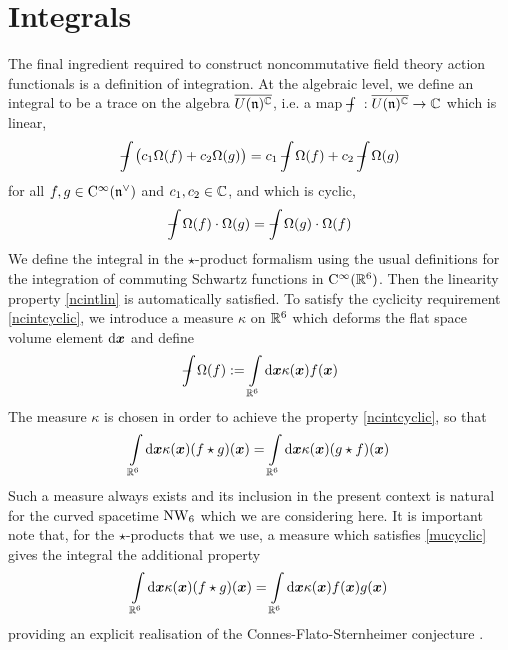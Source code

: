 \section{Integrals}
\label{Integrals}
The final ingredient required to construct noncommutative field theory action
functionals is a definition of integration. At the algebraic level, we define an
integral to be a trace on the algebra $\overline{U({\mathfrak n})^{\mathbb C}}$, i.e. a map
$\int\!\!\!\!\!\! - ~:\overline{U({\mathfrak n})^{\mathbb C}}\to{\mathbb C}$ which is linear,
\begin{equation}
  \label{ncintlin}
  \ncint\bigl(c_1 \Omega(f)+c_2 \Omega(g)\bigr)=
  c_1 \ncint\Omega(f)+c_2 \ncint\Omega(g)
\end{equation}
for all $f,g\in{\rm C}^\infty({\mathfrak n}^\vee)$ and $c_1,c_2\in{\mathbb C}$, and which is cyclic,
\begin{equation}
  \label{ncintcyclic}
  \ncint\Omega(f)\cdot\Omega(g)=\ncint\Omega(g)\cdot\Omega(f)
\end{equation}
We define the integral in the $\star$-product formalism using the usual
definitions for the integration of commuting Schwartz functions in
${\rm C}^\infty({\mathbb R}^6)$. Then the linearity property \eqref{ncintlin} is
automatically satisfied. To satisfy the cyclicity requirement
\eqref{ncintcyclic}, we introduce
\cite{CalWohl1,BehrSyk1,Agostini:2004cu,Dimitrijevic:2003wv,FelShoi1} a measure
$\kappa$ on ${\mathbb R}^6$ which deforms the flat space volume element ${\rm d}{\boldsymbol {x} }$ and
define
\begin{equation}
  \label{ncintdef}
  \ncint\Omega(f):=\int\limits_{\R^6} \dd\mbf x \kappa(\mbf x) f(\mbf x)
\end{equation}
The measure $\kappa$ is chosen in order to achieve the property
\eqref{ncintcyclic}, so that
\begin{equation}
  \label{mucyclic}
  \int\limits_{{\mathbb R}^6} {\rm d}{\boldsymbol {x} } \kappa({\boldsymbol {x} }) (f\star g)({\boldsymbol {x} })=
  \int\limits_{{\mathbb R}^6} {\rm d}{\boldsymbol {x} } \kappa({\boldsymbol {x} }) (g\star f)({\boldsymbol {x} })
\end{equation}
Such a measure always exists \cite{CalWohl1,Dimitrijevic:2003wv,FelShoi1} and
its inclusion in the present context is natural for the curved spacetime $\operatorname{NW}_6$
which we are considering here. It is important note that, for the
$\star$-products that we use, a measure which satisfies \eqref{mucyclic} gives
the integral the additional property
\begin{equation}
  \label{ncintaddprop}
  \int\limits_{{\mathbb R}^6} {\rm d}{\boldsymbol {x} } \kappa({\boldsymbol {x} }) (f\star g)({\boldsymbol {x} })=
  \int\limits_{{\mathbb R}^6} {\rm d}{\boldsymbol {x} } \kappa({\boldsymbol {x} }) f({\boldsymbol {x} }) g({\boldsymbol {x} })
\end{equation}
providing an explicit realisation of the Connes-Flato-Sternheimer conjecture
\cite{FelShoi1}.

